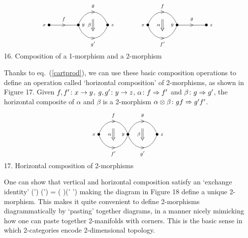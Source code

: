 \bfig
\[
 \xy 
  (-15,0)*{\bullet}="1";
  (0,0)*{\bullet}="2";
  (15,0)*{\bullet}="3";
 "2";"3" **\crv{(3,9) & (12,9)};
  "2";"3" **\crv{(3,-9) & (12,-9)};
  "1";"2" **\crv{};
    (7.5,6.75)*{\scriptstyle >}+(0,3)*{\scriptstyle g};
    (7.5,-6.75)*{\scriptstyle >}-(0,3)*{\scriptstyle g'};
    (-7.5,0)*{\scriptstyle >}+(0,3)*{\scriptstyle f};
  {\ar@{=>}_{\scriptstyle \beta}(7.5,3)*{};(7.5,-3)*{}} ;
    (-17.5,0)*{\scriptstyle x};
  (2.5,0)*{\scriptstyle y};
  (17.5,0)*{\scriptstyle z};
 \endxy
\qquad 
\qquad
 \xy 
  (-15,0)*{\bullet}="1";
  (0,0)*{\bullet}="2";
  (15,0)*{\bullet}="3";
 "1";"2" **\crv{(-12,9) & (-3,9)};
  "1";"2" **\crv{(-12,-9) & (-3,-9)};
  "2";"3" **\crv{};
    (-7.5,6.75)*{\scriptstyle >}+(0,3)*{\scriptstyle f};
    (-7.5,-6.75)*{\scriptstyle >}-(0,3)*{\scriptstyle f'};
    (7.5,0)*{\scriptstyle >}+(0,3)*{\scriptstyle g};
  {\ar@{=>}_{\scriptstyle \alpha}(-7.5,3)*{};(-7.5,-3)*{}} ;
    (-17.5,0)*{\scriptstyle x};
  (-2.5,0)*{\scriptstyle y};
  (17.5,0)*{\scriptstyle z};
 \endxy
\]
16.  Composition of a 1-morphism and a 2-morphism
\efig

\noindent  Thanks to eq.\ (\ref{cartprod}), we can
use these basic composition operations to define an operation
called `horizontal composition' of 2-morphisms, as shown in
Figure 17.  Given $f,f' \colon x \to y$, $g,g' \colon y \to z$,
$\alpha \colon f \Rightarrow f'$ and $\beta \colon g \Rightarrow
g'$, the horizontal composite of $\alpha$ and $\beta$ is a
2-morphism $\alpha \otimes \beta \colon gf \Rightarrow g'f'$.

\bfig
\[
 \xy 
  (-15,0)*{\bullet}="1";
  (0,0)*{\bullet}="2";
  (15,0)*{\bullet}="3";
 "1";"2" **\crv{(-12,9) & (-3,9)};
  "1";"2" **\crv{(-12,-9) & (-3,-9)};
   "2";"3" **\crv{(3,9) & (12,9)} ;
    "2";"3" **\crv{ (3,-9)& (12,-9) };
    (-7.5,6.75)*{\scriptstyle >}+(0,3)*{\scriptstyle f};
    (7.5,6.75)*{\scriptstyle >}+(0,3)*{\scriptstyle g};
    (-7.5,-6.75)*{\scriptstyle >}+(0,-3)*{\scriptstyle f'};
    (7.5,-6.75)*{\scriptstyle >}+(0,-3)*{\scriptstyle g'};
    (-17.5,0)*{\scriptstyle x};
  (-2.5,0)*{\scriptstyle y};
  (17.5,0)*{\scriptstyle z};
  {\ar@{=>}_{\scriptstyle \beta}(7.5,3)*{};(7.5,-3)*{}} ;
  {\ar@{=>}_{\scriptstyle \alpha}(-7.5,3)*{};(-7.5,-3)*{}} ;
 \endxy
\]
17.  Horizontal composition of 2-morphisms
\efig

\noindent One can show that vertical and horizontal composition satisfy an
`exchange identity'
\be    (\alpha \alpha') \tensor (\beta\beta') = (\alpha \tensor
\beta)(\alpha' \tensor \beta')  \label{exchange} \ee
making the diagram in Figure 18 define a unique 2-morphism.
This makes it quite convenient to define 2-morphisms
diagrammatically by `pasting' together diagrams, in a manner nicely
mimicking how one can paste together 2-manifolds with corners.
This is the basic sense in which 2-categories encode
2-dimensional topology.

